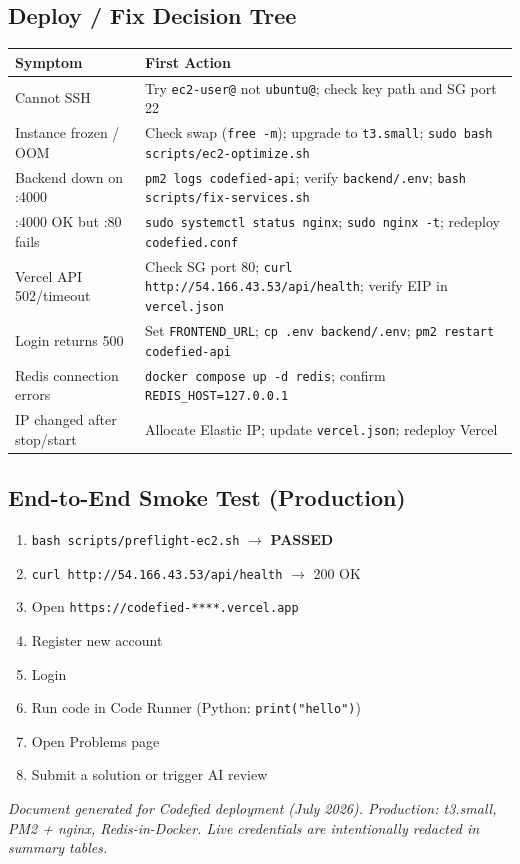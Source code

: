 \documentclass[11pt,a4paper]{article}
\newcommand{\maskedvercelurl}{\texttt{https://codefied-****.vercel.app}}
\begin{document}
\subsection{Deploy / Fix Decision Tree}
\begin{center}
\small
\begin{tabular}{@{}p{4.5cm}p{7.8cm}@{}}
\toprule
\textbf{Symptom} & \textbf{First Action} \\
\midrule
Cannot SSH &
Try \texttt{ec2-user@} not \texttt{ubuntu@}; check key path and SG port 22 \\
\addlinespace
Instance frozen / OOM &
Check swap (\texttt{free -m}); upgrade to \texttt{t3.small}; \texttt{sudo bash scripts/ec2-optimize.sh} \\
\addlinespace
Backend down on :4000 &
\texttt{pm2 logs codefied-api}; verify \texttt{backend/.env}; \texttt{bash scripts/fix-services.sh} \\
\addlinespace
:4000 OK but :80 fails &
\texttt{sudo systemctl status nginx}; \texttt{sudo nginx -t}; redeploy \texttt{codefied.conf} \\
\addlinespace
Vercel API 502/timeout &
Check SG port 80; \texttt{curl http://54.166.43.53/api/health}; verify EIP in \texttt{vercel.json} \\
\addlinespace
Login returns 500 &
Set \texttt{FRONTEND\_URL}; \texttt{cp .env backend/.env}; \texttt{pm2 restart codefied-api} \\
\addlinespace
Redis connection errors &
\texttt{docker compose up -d redis}; confirm \texttt{REDIS\_HOST=127.0.0.1} \\
\addlinespace
IP changed after stop/start &
Allocate Elastic IP; update \texttt{vercel.json}; redeploy Vercel \\
\bottomrule
\end{tabular}
\end{center}

\subsection{End-to-End Smoke Test (Production)}
\begin{enumerate}[noitemsep]
  \item \texttt{bash scripts/preflight-ec2.sh} $\rightarrow$ \textbf{PASSED}
  \item \texttt{curl http://54.166.43.53/api/health} $\rightarrow$ 200 OK
  \item Open \maskedvercelurl
  \item Register new account
  \item Login
  \item Run code in Code Runner (Python: \texttt{print("hello")})
  \item Open Problems page
  \item Submit a solution or trigger AI review
\end{enumerate}

\vfill
\begin{center}
\small\textit{Document generated for Codefied deployment (July 2026). Production: t3.small, PM2 + nginx, Redis-in-Docker. Live credentials are intentionally redacted in summary tables.}
\end{center}
\end{document}
